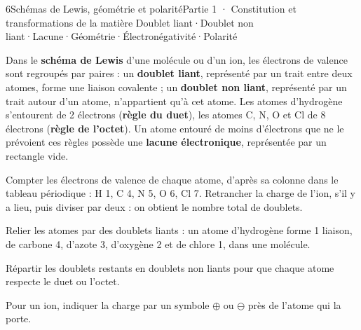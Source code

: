 \begin{ouverture}[lewis]{6}{Schémas de Lewis, géométrie et polarité}{Partie 1 · Constitution et transformations de la matière}
{Doublet liant\enspace·\enspace Doublet non liant\enspace·\enspace Lacune\enspace·\enspace Géométrie\enspace·\enspace Électronégativité\enspace·\enspace Polarité}
\end{ouverture}
\essentiel
{}
\begin{definition}
Dans le \textbf{schéma de Lewis} d'une molécule ou d'un ion, les électrons de valence sont regroupés par paires : un
\textbf{doublet liant}, représenté par un trait entre deux atomes, forme une liaison covalente ; un \textbf{doublet non liant},
représenté par un trait autour d'un atome, n'appartient qu'à cet atome. Les atomes d'hydrogène s'entourent de 2 électrons
(\textbf{règle du duet}), les atomes C, N, O et Cl de 8 électrons (\textbf{règle de l'octet}). Un atome entouré de moins
d'électrons que ne le prévoient ces règles possède une \textbf{lacune électronique}, représentée par un rectangle vide.
\end{definition}
\begin{savoirfaire}
\begin{questions}
\item Compter les électrons de valence de chaque atome, d'après sa colonne dans le tableau périodique : H 1, C 4, N 5, O 6,
Cl 7. Retrancher la charge de l'ion, s'il y a lieu, puis diviser par deux : on obtient le nombre total de doublets.
\item Relier les atomes par des doublets liants : un atome d'hydrogène forme 1 liaison, de carbone 4, d'azote 3,
d'oxygène 2 et de chlore 1, dans une molécule.
\item Répartir les doublets restants en doublets non liants pour que chaque atome respecte le duet ou l'octet.
\item Pour un ion, indiquer la charge par un symbole $\oplus$ ou $\ominus$ près de l'atome qui la porte.
\end{questions}
\end{savoirfaire}

